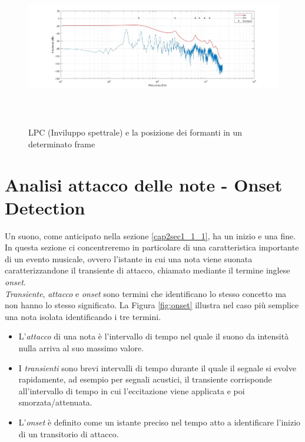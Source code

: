\documentclass[12pt]{report}
\begin{document}
\begin{figure}[htbp]
\centerline{\includegraphics[height=70mm]{img/speech}}
\caption{LPC (Inviluppo spettrale) e la posizione dei formanti in un determinato frame}
\label{fig:speech}
\end{figure}

\clearpage

	\section{Analisi attacco delle note - Onset Detection}
	\label{cap3sec4}
		Un suono, come anticipato nella sezione \ref{cap2sec1_1_1}, ha un inizio e una fine. In questa sezione ci concentreremo in particolare di una caratteristica importante di un evento musicale, ovvero l'istante in cui una nota viene suonata caratterizzandone il transiente di attacco, chiamato mediante il termine inglese {\itshape onset}.\\
{\itshape Transiente}, {\itshape attacco} e {\itshape onset} sono termini che identificano lo stesso concetto ma non hanno lo stesso significato\cite{onset}. La Figura \ref{fig:onset} illustra nel caso più semplice una nota isolata identificando i tre termini.

\begin{itemize}
\item L'{\itshape attacco} di una nota è l'intervallo di tempo nel quale il suono da intensità nulla arriva al suo massimo valore.
\item I {\itshape transienti} sono brevi intervalli di tempo durante il quale il segnale si evolve rapidamente, ad esempio per segnali acustici, il transiente corrisponde all'intervallo di tempo in cui l'eccitazione viene applicata e poi smorzata/attenuata.
\item L'{\itshape onset} è definito come un istante preciso nel tempo atto a identificare l'inizio di un transitorio di attacco. 
\end{itemize}		
\end{document}
